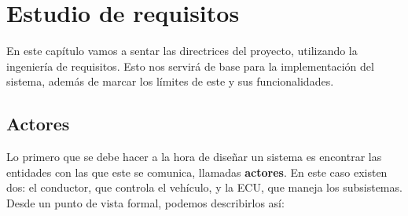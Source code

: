 \chapter{Estudio de requisitos}
En este capítulo vamos a sentar las directrices del proyecto, utilizando la ingeniería de requisitos. Esto nos servirá de base para la implementación del sistema, además de marcar los límites de este y sus funcionalidades. 

\section{Actores}
Lo primero que se debe hacer a la hora de diseñar un sistema es encontrar las entidades con las que este se comunica, llamadas \textbf{actores}. 
En este caso existen dos: el conductor, que controla el vehículo, y la ECU, que maneja los subsistemas. Desde un punto de vista formal, podemos describirlos así: 



